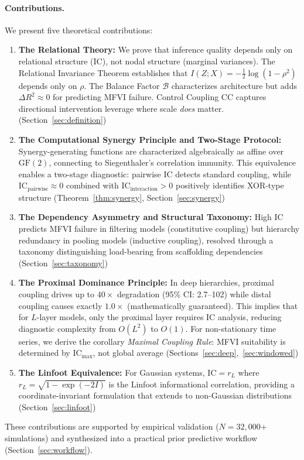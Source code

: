 \documentclass[10pt]{article} %
\theoremstyle{plain}
\theoremstyle{definition}
\newcommand{\IC}{\mathrm{IC}}  %
\newcommand{\BB}{\mathcal{B}}  %
\newcommand{\CC}{\mathrm{CC}}  %
\begin{document}
\paragraph{Contributions.} We present five theoretical contributions:
\begin{enumerate}
    \item \textbf{The Relational Theory:} We prove that inference quality depends only on relational structure (IC), not nodal structure (marginal variances). The Relational Invariance Theorem establishes that $I(Z;X) = -\frac{1}{2}\log(1-\rho^2)$ depends only on $\rho$. The Balance Factor $\BB$ characterizes architecture but adds $\Delta R^2 \approx 0$ for predicting MFVI failure. Control Coupling $\CC$ captures directional intervention leverage where scale \emph{does} matter. (Section~\ref{sec:definition})
    \item \textbf{The Computational Synergy Principle and Two-Stage Protocol:} Synergy-generating functions are characterized algebraically as affine over $\text{GF}(2)$, connecting to Siegenthaler's correlation immunity. This equivalence enables a two-stage diagnostic: pairwise IC detects standard coupling, while $\IC_{\text{pairwise}} \approx 0$ combined with $\IC_{\text{interaction}} > 0$ positively identifies XOR-type structure (Theorem~\ref{thm:synergy}, Section~\ref{sec:synergy})
    \item \textbf{The Dependency Asymmetry and Structural Taxonomy:} High IC predicts MFVI failure in filtering models (constitutive coupling) but hierarchy redundancy in pooling models (inductive coupling), resolved through a taxonomy distinguishing load-bearing from scaffolding dependencies (Section~\ref{sec:taxonomy})
    \item \textbf{The Proximal Dominance Principle:} In deep hierarchies, proximal coupling drives up to $40\times$ degradation (95\% CI: 2.7--102) while distal coupling causes exactly $1.0\times$ (mathematically guaranteed). This implies that for $L$-layer models, only the proximal layer requires IC analysis, reducing diagnostic complexity from $O(L^2)$ to $O(1)$. For non-stationary time series, we derive the corollary \emph{Maximal Coupling Rule}: MFVI suitability is determined by $\IC_{\max}$, not global average (Sections~\ref{sec:deep},~\ref{sec:windowed})
    \item \textbf{The Linfoot Equivalence:} For Gaussian systems, $\IC = r_L$ where $r_L = \sqrt{1 - \exp(-2I)}$ is the Linfoot informational correlation, providing a coordinate-invariant formulation that extends to non-Gaussian distributions (Section~\ref{sec:linfoot})
\end{enumerate}
These contributions are supported by empirical validation ($N = 32{,}000$+ simulations) and synthesized into a practical prior predictive workflow (Section~\ref{sec:workflow}).
\end{document}
